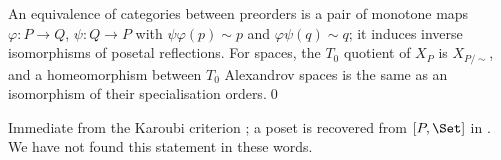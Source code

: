\direct{} An equivalence of categories between preorders is a pair of monotone maps $\varphi : P\to Q$, $\psi : Q\to P$ with $\psi\varphi(p)\sim p$ and $\varphi\psi(q)\sim q$; it induces inverse isomorphisms of posetal reflections. For spaces, the $T_0$ quotient of $X_P$ is $X_{P/\sim}$, and a homeomorphism between $T_0$ Alexandrov spaces is the same as an isomorphism of their specialisation orders.\qed

\status{} Immediate from the Karoubi criterion \cite[A1.1.9--10]{elephant}; a poset is recovered from $[P,\Set]$ in \cite[\S4.1]{caramello-stone}. We have not found this statement in these words.
